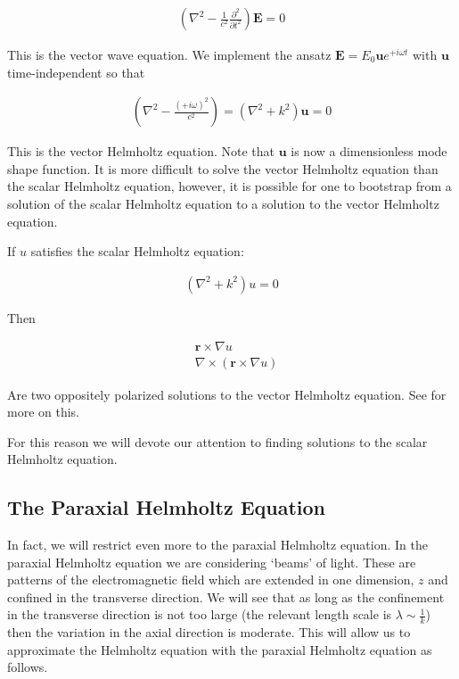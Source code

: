 \documentclass[12pt]{article}
\newcommand{\bv}[1]{\boldsymbol{#1}}
\begin{document}
\begin{align}
\left(\nabla^2 - \frac{1}{c^2}\frac{\partial^2}{\partial t^2}\right)\bv{E} = 0
\end{align}

This is the vector wave equation.
We implement the ansatz $\bv{E} = E_0\bv{u}e^{+i\omega t}$ with $\bv{u}$ time-independent so that

\begin{align}
\left(\nabla^2 - \frac{(+i\omega)^2}{c^2}\right) = \left(\nabla^2 + k^2\right)\bv{u} = 0
\end{align}

This is the vector Helmholtz equation.
Note that $\bv{u}$ is now a dimensionless mode shape function.
It is more difficult to solve the vector Helmholtz equation than the scalar Helmholtz equation, however, it is possible for one to bootstrap from a solution of the scalar Helmholtz equation to a solution to the vector Helmholtz equation.

If $u$ satisfies the scalar Helmholtz equation:

\begin{align}
\left(\nabla^2 + k^2\right)u = 0
\end{align}

Then

\begin{align}
&\bv{r}\times \nabla u\\
&\nabla \times (\bv{r}\times \nabla u)
\end{align}

Are two oppositely polarized solutions to the vector Helmholtz equation. See \cite{Reitz1960} for more on this.

For this reason we will devote our attention to finding solutions to the scalar Helmholtz equation.

\subsection{The Paraxial Helmholtz Equation}

In fact, we will restrict even more to the paraxial Helmholtz equation.
In the paraxial Helmholtz equation we are considering `beams' of light.
These are patterns of the electromagnetic field which are extended in one dimension, $z$ and confined in the transverse direction.
We will see that as long as the confinement in the transverse direction is not too large (the relevant length scale is $\lambda \sim \frac{1}{k}$) then the variation in the axial direction is moderate.
This will allow us to approximate the Helmholtz equation with the paraxial Helmholtz equation as follows.
\end{document}
